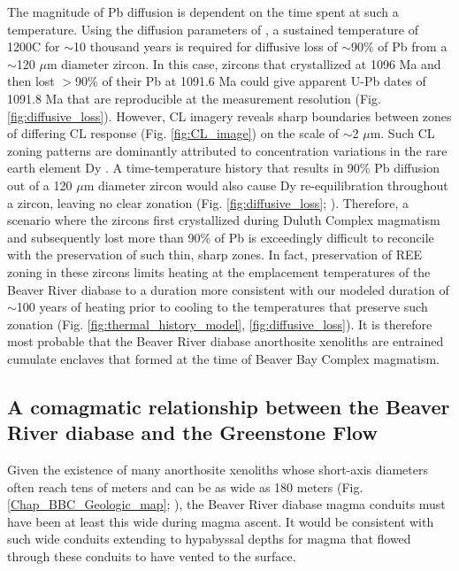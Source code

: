 The magnitude of Pb diffusion is dependent on the time spent at such a temperature. Using the diffusion parameters of \cite{Cherniak2001a}, a sustained temperature of 1200\textdegree C for $\sim$10 thousand years is required for diffusive loss of $\sim$90\% of Pb from a $\sim$120 $\mu$m diameter zircon. In this case, zircons that crystallized at 1096 Ma and then lost $>$90\% of their Pb at 1091.6 Ma could give apparent U-Pb dates of 1091.8 Ma that are reproducible at the measurement resolution (Fig. \ref{fig:diffusive_loss}). However, CL imagery reveals sharp boundaries between zones of differing CL response (Fig. \ref{fig:CL_image}) on the scale of $\sim$2 $\mu$m. Such CL zoning patterns are dominantly attributed to concentration variations in the rare earth element Dy \citep{Remond1992a}. A time-temperature history that results in 90\% Pb diffusion out of a 120 $\mu$m diameter zircon would also cause Dy re-equilibration throughout a zircon, leaving no clear zonation (Fig. \ref{fig:diffusive_loss}; \cite{Cherniak1997a}). Therefore, a scenario where the zircons first crystallized during Duluth Complex magmatism and subsequently lost more than 90\% of Pb is exceedingly difficult to reconcile with the preservation of such thin, sharp zones. In fact, preservation of REE zoning in these zircons limits heating at the emplacement temperatures of the Beaver River diabase to a duration more consistent with our modeled duration of $\sim$100 years of heating prior to cooling to the temperatures that preserve such zonation (Fig. \ref{fig:thermal_history_model}, \ref{fig:diffusive_loss}). It is therefore most probable that the Beaver River diabase anorthosite xenoliths are entrained cumulate enclaves that formed at the time of Beaver Bay Complex magmatism. 

\subsection{A comagmatic relationship between the Beaver River diabase and the Greenstone Flow}

Given the existence of many anorthosite xenoliths whose short-axis diameters often reach tens of meters and can be as wide as 180 meters (Fig. \ref{Chap_BBC_Geologic_map}; \cite{Boerboom2004a, Boerboom2006b}), the Beaver River diabase magma conduits must have been at least this wide during magma ascent. It would be consistent with such wide conduits extending to hypabyssal depths for magma that flowed through these conduits to have vented to the surface.
 
